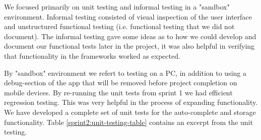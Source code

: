 We focused primarily on unit testing and informal testing in a "sandbox"
environment. Informal testing consisted of visual inspection of the user
interface and unstructured functional testing (i.e. functional testing that we
did not document). The informal testing gave some ideas as to how we could
develop and document our functional tests later in the project, it was also
helpful in verifying that functionality in the frameworks worked as expected.




\begin{table}[htb]
	\label{sprint2:unit-testing-table}
	\centering
  \caption{Excerpt from unit testing}
\end{table}
By "sandbox" environment we refert to testing on a PC, in addition to using a
debug-section of the app that will be removed before project completion on
mobile devices.
By re-running the unit tests from sprint 1 we had efficient regression testing.
This was very helpful in the process of expanding functionality. We have
developed a complete set of unit tests for the auto-complete and storage
functionality. Table \ref{sprint2:unit-testing-table} contains an excerpt from
the unit testing.

